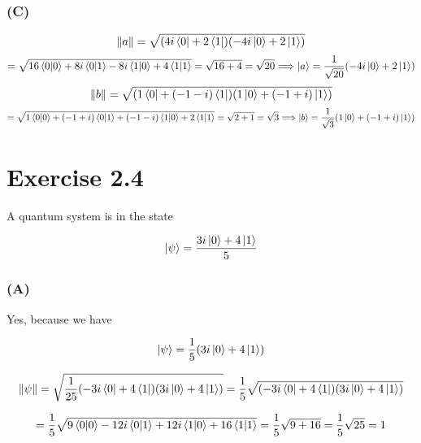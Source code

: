 \documentclass[12pt]{article}
\begin{document}
\subsubsection*{(C)}
\[
\|a\| = \sqrt{(4i\bra{0} + 2\bra{1})(-4i\ket{0} + 2\ket{1})}
\]
\[
= \sqrt{16\braket{0|0}+8i\braket{0|1}-8i\braket{1|0}+4\braket{1|1}} =  \sqrt{16 + 4} = \sqrt{20} \Longrightarrow \ket{a} = \frac{1}{\sqrt{20}}(-4i\ket{0} + 2\ket{1})
\]
\[
\|b\| = \sqrt{(1\bra{0} + (-1-i)\bra{1})(1\ket{0} + (-1+i)\ket{1})}
\]
\[
= \sqrt{1\braket{0|0}+(-1+i)\braket{0|1}+(-1-i)\braket{1|0}+2\braket{1|1}} =  \sqrt{2 + 1} = \sqrt{3} \Longrightarrow \ket{b} = \frac{1}{\sqrt{3}}(1\ket{0} + (-1+i)\ket{1})
\]

\section*{Exercise 2.4}
A quantum system is in the state

\[
\ket{\psi} = \frac{3i\ket{0} + 4\ket{1}}{5}
\]

\subsubsection*{(A)}

Yes, because we have

\[
\ket{\psi} = \frac{1}{5}(3i\ket{0} + 4\ket{1})
\]

\[
\|\psi\| = \sqrt{\frac{1}{25}(-3i\bra{0} + 4\bra{1})(3i\ket{0} + 4\ket{1})}
= \frac{1}{5}\sqrt{(-3i\bra{0} + 4\bra{1})(3i\ket{0} + 4\ket{1})}
\]

\[
= \frac{1}{5}\sqrt{9\braket{0|0} - 12i\braket{0|1} + 12i\braket{1|0} + 16\braket{1|1}}
= \frac{1}{5}\sqrt{9+16} = \frac{1}{5}\sqrt{25} = 1
\]
\end{document}
